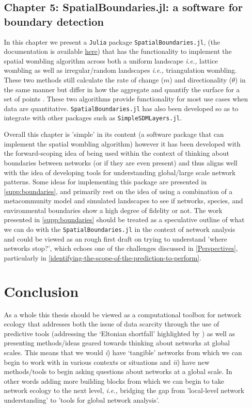 \subsection{Chapter 5: SpatialBoundaries.jl: a software for boundary detection}

In this chapter we present a \texttt{Julia} package \texttt{SpatialBoundaries.jl}, (the documentation is available \href{https://poisotlab.github.io/SpatialBoundaries.jl/dev/}{here}) that has the functionality to implement the spatial wombling algorithm across both a uniform landscape \emph{i.e.,} lattice wombling as well as irregular/random landscapes \emph{i.e.,} triangulation wombling. These two methods still calculate the rate of change (\(m\)) and directionality (\(\theta\)) in the same manner but differ in how the aggregate and quantify the surface for a set of points \cite{Fortin2005SpaAna}. These two algorithms provide functionality for most use cases when data are quantitative. \texttt{SpatialBoundaries.jl} has also been developed so as to integrate with other packages such as \texttt{SimpleSDMLayers.jl}.

Overall this chapter is 'simple' in its content (a software package that can implement the spatial wombling algorithm) however it has been developed with the forward-scoping idea of being used within the context of thinking about boundaries between networks (or if they are even present) and thus aligns well with the idea of developing tools for understanding global/large scale network patterns. Some ideas for implementing this package are presented in \autoref{supp:boundaries}, and primarily rest on the idea of using a combination of a metacommunity model and simulated landscapes to see if networks, species, and environmental boundaries show a high degree of fidelity or not. The work presented in \autoref{supp:boundaries} should be treated as a speculative outline of what we can do with the \texttt{SpatialBoundaries.jl} in the context of network analysis and could be viewed as an rough first draft on trying to understand 'where networks stop?', which echoes one of the challenges discussed in \autoref{Perspectives}, particularly in \autoref{identifying-the-scope-of-the-prediction-to-perform}.

\section{Conclusion}\label{conclusion}

As a whole this thesis should be viewed as a computational toolbox for
network ecology that addresses both the issue of data scarcity through
the use of predictive tools (addressing the `Eltonian shortfall' highlighted by \cite{Hortal2015SevSho}) as well as presenting methods/ideas geared towards thinking about networks at global scales. This means that we would \emph{i}) have `tangible' networks from which we can begin to work with in various contexts or situations and \emph{ii}) have new methods/tools to begin asking questions about networks at a global scale. In other words adding more building blocks from which we can begin to take network ecology to the next level, \emph{i.e.,} bridging the gap from 'local-level network understanding' to 'tools for global network analysis'.



\endinput
